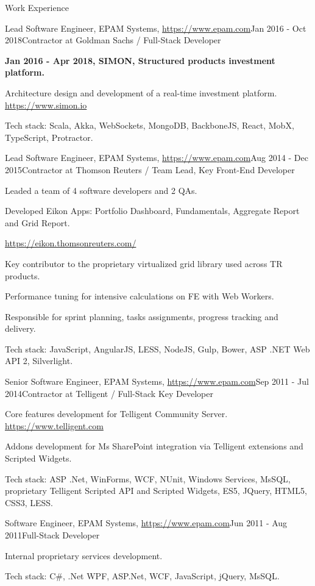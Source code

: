 \documentclass{resume}
\begin{document}
\begin{rSection}{Work Experience}
\begin{rSubsection}{Lead Software Engineer, EPAM Systems, \url{https://www.epam.com}}{Jan 2016 - Oct 2018}{Contractor at Goldman Sachs / Full-Stack Developer}{}
\item[] \textbf{Jan 2016 - Apr 2018, SIMON, Structured products investment platform.}
\item Architecture design and development of a real-time investment platform. \url{https://www.simon.io}

Tech stack: Scala, Akka, WebSockets, MongoDB, BackboneJS, React, MobX, TypeScript, Protractor.
\end{rSubsection}


\begin{rSubsection}{Lead Software Engineer, EPAM Systems, \url{https://www.epam.com}}{Aug 2014 - Dec 2015}{Contractor at Thomson Reuters / Team Lead, Key Front-End Developer}{}
\item Leaded a team of 4 software developers and 2 QAs.
\item Developed Eikon Apps: Portfolio Dashboard, Fundamentals, Aggregate Report and Grid Report.
\item[] \url{https://eikon.thomsonreuters.com/}
\item Key contributor to the proprietary virtualized grid library used across TR products.
\item Performance tuning for intensive calculations on FE with Web Workers.
\item Responsible for sprint planning, tasks assignments, progress tracking and delivery.

Tech stack: JavaScript, AngularJS, LESS, NodeJS, Gulp, Bower, ASP .NET Web API 2, Silverlight.
\end{rSubsection}

\begin{rSubsection}{Senior Software Engineer, EPAM Systems, \url{https://www.epam.com}}{Sep 2011 - Jul 2014}{Contractor at Telligent / Full-Stack Key Developer}{}
\item Core features development for Telligent Community Server. \url{https://www.telligent.com}
\item Addons development for Ms SharePoint integration via Telligent extensions and Scripted Widgets.

Tech stack:  ASP .Net, WinForms, WCF, NUnit, Windows Services, MsSQL, proprietary Telligent Scripted API and Scripted Widgets, ES5, JQuery, HTML5, CSS3, LESS.
\end{rSubsection}


\begin{rSubsection}{Software Engineer, EPAM Systems, \url{https://www.epam.com}}{Jun 2011 - Aug 2011}{Full-Stack Developer}{}
\item Internal proprietary services development.

Tech stack: C\#, .Net WPF, ASP.Net, WCF, JavaScript, jQuery, MsSQL.
\end{rSubsection}

\end{rSection}
\end{document}
